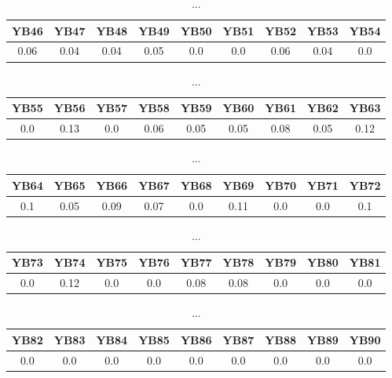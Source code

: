 \documentclass[]{article}
\begin{document}
\begin{table}[h]
      \centering
      \begin{tabular}{|c|c|c|c|c|c|c|c|c|}
            \hline
            YB46 & YB47 & YB48 & YB49 & YB50 & YB51 & YB52 & YB53 & YB54 \\
            \hline
            0.06 & 0.04 & 0.04 & 0.05 & 0.0  & 0.0  & 0.06 & 0.04 & 0.0  \\
            \hline
      \end{tabular}
      \caption{...}
\end{table}
\begin{table}[h]
      \centering
      \begin{tabular}{|c|c|c|c|c|c|c|c|c|}
            \hline
            YB55 & YB56 & YB57 & YB58 & YB59 & YB60 & YB61 & YB62 & YB63 \\
            \hline
            0.0  & 0.13 & 0.0  & 0.06 & 0.05 & 0.05 & 0.08 & 0.05 & 0.12 \\
            \hline
      \end{tabular}
      \caption{...}
\end{table}
\begin{table}[h]
      \centering
      \begin{tabular}{|c|c|c|c|c|c|c|c|c|}
            \hline
            YB64 & YB65 & YB66 & YB67 & YB68 & YB69 & YB70 & YB71 & YB72 \\
            \hline
            0.1  & 0.05 & 0.09 & 0.07 & 0.0  & 0.11 & 0.0  & 0.0  & 0.1  \\
            \hline
      \end{tabular}
      \caption{...}
\end{table}
\begin{table}[h]
      \centering
      \begin{tabular}{|c|c|c|c|c|c|c|c|c|}
            \hline
            YB73 & YB74 & YB75 & YB76 & YB77 & YB78 & YB79 & YB80 & YB81 \\
            \hline
            0.0  & 0.12 & 0.0  & 0.0  & 0.08 & 0.08 & 0.0  & 0.0  & 0.0  \\
            \hline
      \end{tabular}
      \caption{...}
\end{table}
\begin{table}[h]
      \centering
      \begin{tabular}{|c|c|c|c|c|c|c|c|c|}
            \hline
            YB82 & YB83 & YB84 & YB85 & YB86 & YB87 & YB88 & YB89 & YB90 \\
            \hline
            0.0  & 0.0  & 0.0  & 0.0  & 0.0  & 0.0  & 0.0  & 0.0  & 0.0  \\
            \hline
      \end{tabular}
      \caption{...}
\end{table}
\end{document}
